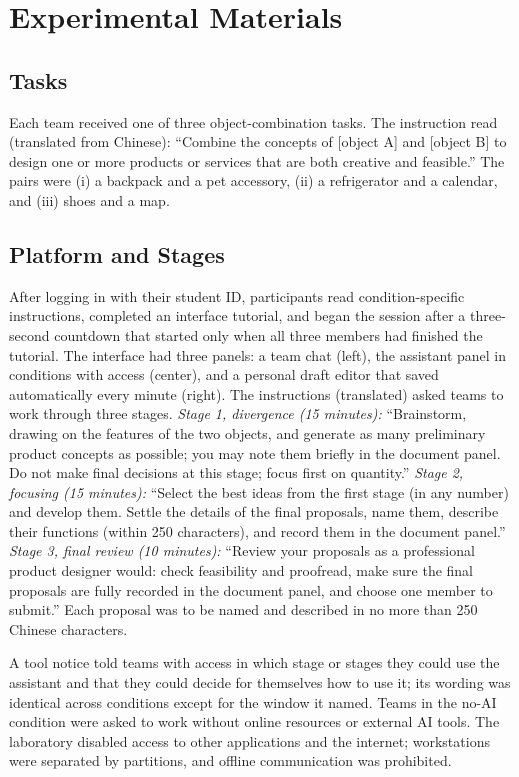 \section{Experimental Materials}\label{ec:materials}
%

\subsection{Tasks}
Each team received one of three object-combination tasks. The instruction read (translated from Chinese): ``Combine the
concepts of [object A] and [object B] to design one or more products or services that are both creative and
feasible.'' The pairs were (i) a backpack and a pet accessory, (ii) a refrigerator and a calendar, and (iii) shoes and a
map.

\subsection{Platform and Stages}
After logging in with their student ID, participants read condition-specific instructions, completed an interface
tutorial, and began the session after a three-second countdown that started only when all three members had finished
the tutorial. The interface had three panels: a team chat (left), the assistant panel in conditions with access
(center), and a personal draft editor that saved automatically every minute (right). The instructions (translated)
asked teams to work through three stages. \emph{Stage 1, divergence (15 minutes):} ``Brainstorm, drawing on the
features of the two objects, and generate as many preliminary product concepts as possible; you may note them briefly
in the document panel. Do not make final decisions at this stage; focus first on quantity.'' \emph{Stage 2, focusing
(15 minutes):} ``Select the best ideas from the first stage (in any number) and develop them. Settle the details of the
final proposals, name them, describe their functions (within 250 characters), and record them in the document panel.''
\emph{Stage 3, final review (10 minutes):} ``Review your proposals as a professional product designer would: check
feasibility and proofread, make sure the final proposals are fully recorded in the document panel, and choose one member
to submit.'' Each proposal was to be named and described in no more than 250 Chinese characters.

A tool notice told teams with access in which stage or stages they could use the assistant and that they could decide
for themselves how to use it; its wording was identical across conditions except for the window it named. Teams in the
no-AI condition were asked to work without online resources or external AI tools. The laboratory disabled access to
other applications and the internet; workstations were separated by partitions, and offline communication was
prohibited.

